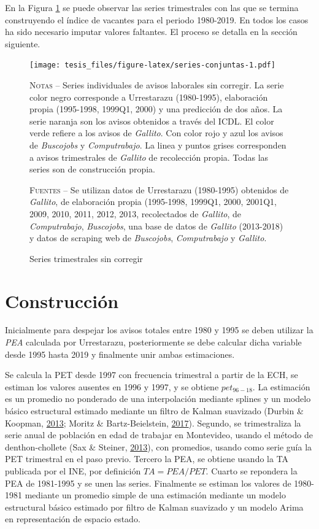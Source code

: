 \documentclass[12pt,oneside]{reedthesis}
\begin{document}
En la Figura \ref{fig:series-conjuntas} se puede observar las series trimestrales con las que se termina construyendo el índice de vacantes para el periodo 1980-2019. En todos los casos ha sido necesario imputar valores faltantes. El proceso se detalla en la sección siguiente.
\begin{figure}
\texttt{[image: tesis\_files/figure-latex/series-conjuntas-1.pdf]}
\caption{Series trimestrales sin corregir}\label{fig:series-conjuntas}\textsc{}

\footnotesize\textsc{Notas} -- Series individuales de avisos laborales sin corregir. La serie color negro corresponde a Urrestarazu (1980-1995), elaboración propia (1995-1998, 1999Q1, 2000) y una predicción de dos años. La serie naranja son los avisos obtenidos a través del ICDL. El color verde refiere a los avisos de \textit{Gallito}. Con color rojo y azul los avisos de \textit{Buscojobs} y \textit{Computrabajo}. La linea y puntos grises corresponden a avisos trimestrales de \textit{Gallito} de recolección propia. Todas las series son de construcción propia.

\textsc{Fuentes} -- Se utilizan datos de Urrestarazu (1980-1995) obtenidos de \textit{Gallito}, de elaboración propia (1995-1998, 1999Q1, 2000, 2001Q1, 2009, 2010, 2011, 2012, 2013, recolectados de \textit{Gallito}, de \textit{Computrabajo}, \textit{Buscojobs}, una base de datos de \textit{Gallito} (2013-2018) y datos de scraping web de \textit{Buscojobs}, \textit{Computrabajo} y \textit{Gallito}.
\end{figure}
\hypertarget{construcciuxf3n}{%
\section{Construcción}\label{construcciuxf3n}}

Inicialmente para despejar los avisos totales entre 1980 y 1995 se deben utilizar la \emph{PEA} calculada por Urrestarazu, posteriormente se debe calcular dicha variable desde 1995 hasta 2019 y finalmente unir ambas estimaciones.

Se calcula la PET desde 1997 con frecuencia trimestral a partir de la ECH, se estiman los valores ausentes en 1996 y 1997, y se obtiene \(pet_{96-18}\). La estimación es un promedio no ponderado de una interpolación mediante splines y un modelo básico estructural estimado mediante un filtro de Kalman suavizado (Durbin \& Koopman, \protect\hyperlink{ref-Durbin2013}{2013}; Moritz \& Bartz-Beielstein, \protect\hyperlink{ref-Moritz2017}{2017}).
Segundo, se trimestraliza la serie anual de población en edad de trabajar en Montevideo, usando el método de denthon-chollete (Sax \& Steiner, \protect\hyperlink{ref-Sax2013}{2013}), con promedios, usando como serie guía la PET trimestral en el paso previo. Tercero la PEA, se obtiene usando la TA publicada por el INE, por definición \(TA = PEA/PET\).
Cuarto se repondera la PEA de 1981-1995 y se unen las series. Finalmente se estiman los valores de 1980-1981 mediante un promedio simple de una estimación mediante un modelo estructural básico estimado por filtro de Kalman suavizado y un modelo Arima en representación de espacio estado.
\end{document}
